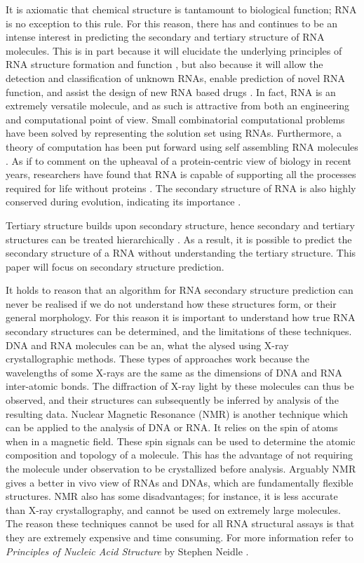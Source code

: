 \documentclass{cshonours}
\begin{document}
It is axiomatic that chemical structure is tantamount to biological function; RNA is no exception to this rule. For this reason, there has and continues to be an intense interest in predicting the secondary and tertiary structure of RNA molecules. This is in part because it will elucidate the underlying principles of RNA structure formation and function \cite{conn1998rna}, but also because it will allow the detection and classification of unknown RNAs, enable prediction of novel RNA function, and assist the design of new RNA based drugs \cite{condon2003problems}. In fact, RNA is an extremely versatile molecule, and as such is attractive from both an engineering and computational point of view. Small combinatorial computational problems have been solved by representing the solution set using RNAs. Furthermore, a theory of computation has been put forward using self assembling RNA molecules \cite{condon2003problems}. As if to comment on the upheaval of a protein-centric view of biology in recent years, researchers have found that RNA is capable of supporting all the processes required for life without proteins \cite{condon2003problems}. The secondary structure of RNA is also highly conserved during evolution, indicating its importance \cite{hofacker2008rna}. 


Tertiary structure builds upon secondary structure, hence secondary and tertiary structures can be treated hierarchically \cite{tinoco1999rna}. As a result, it is possible to predict the secondary structure of a RNA without understanding the tertiary structure. This paper will focus on secondary structure prediction.

It holds to reason that an algorithm for RNA secondary structure prediction can never be realised if we do not understand how these structures form, or their general morphology. For this reason it is important to understand how true RNA secondary structures can be determined, and the limitations of these techniques. DNA and RNA molecules can be an, what the alysed using X-ray crystallographic methods. These types of approaches work because the wavelengths of some X-rays are the same as the dimensions of DNA and RNA inter-atomic bonds. The diffraction of X-ray light by these molecules can thus be observed, and their structures can subsequently be inferred by analysis of the resulting data. Nuclear Magnetic Resonance (NMR) is another technique which can be applied to the analysis of DNA or RNA. It relies on the spin of atoms when in a magnetic field. These spin signals can be used to determine the atomic composition and topology of a molecule. This has the advantage of not requiring the molecule under observation to be crystallized before analysis. Arguably NMR gives a better in vivo view of RNAs and DNAs, which are fundamentally flexible structures. NMR also has some disadvantages; for instance, it is less accurate than X-ray crystallography, and cannot be used on extremely large molecules. The reason these techniques cannot be used for all RNA structural assays is that they are extremely expensive and time consuming. For more information refer to \emph{Principles of Nucleic Acid Structure} by Stephen Neidle \cite{neidle2010principles}.
\end{document}
